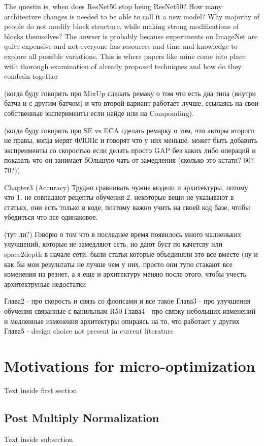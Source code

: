 The questin is, when does ResNet50 stop being ResNet50? How many architecture changes is needed to be able to call it a new model? Why majority of people do not modify block structure, while making strong modifications of blocks themselves? The anwser is probably because experiments on ImageNet are quite expensive and not everyone has resources and time and knowledge to explore all possible variations. This is where papers like mine come into place with thorough examination of already proposed techniques and how do they combain together


(когда буду говорить про MixUp сделать ремаку о том что есть два типа (внутри батча и с другим батчом) и что второй вариант работает лучше, ссылаясь на свои собственные эксперименты если найде или на Componding). 


(когда буду говорить про SE vs ECA сделать ремарку о том, что авторы второго не правы, когда мерят ФЛОПс и говорят что у них меньше. может быть добавить экспреименты со скоростью если делать просто GAP без каких либо операций и показать что он занимает бОльшую чать от замедления (сколько это кстати? 60? 70?))


Chapter3 (Accuracy)
Трудно сравнивать чужие модели и архитектуры, потому что 1. не совпадают рецепты обучения 2. некоторые вещи не указывают в статьях, они есть только в коде, поэтому важно учить на своей код базе, чтобы убедиться что все одинаковое. 

(тут ли?)
Говорю о том что в последнее время появилось много малненьких улучшений, которые не замедляют сеть, но дают буст по качетсву \cite{zhang2019making_aa_shift_invariant} или space2depth  \cite{ridnik2021_tresnet} в начале сети. были статья которые объединяли это все вместе \cite{lee2020compounding_improvements} \cite{bello2021revisiting_resnet} (ну и как бы мои результаты не лучше чем у них, просто они тупо стакают все изменения на резнет, а я еще и архитектуру меняю после этого, чтобы учесть архитектруные недостатки


Глава2 - про скорость и связь со флопсами и все такое
Глава3 - про улучшения обучения связанные с ванильным R50
Глава4 - про связку небольших изменений и медленные изменения архитектуры опираясь на то, что работает у других
Глава5 - design choice not present in current literature


\section{Motivations for micro-optimization}

Text inside first section

\subsection{Post Multiply Normalization}

Text inside subsection
